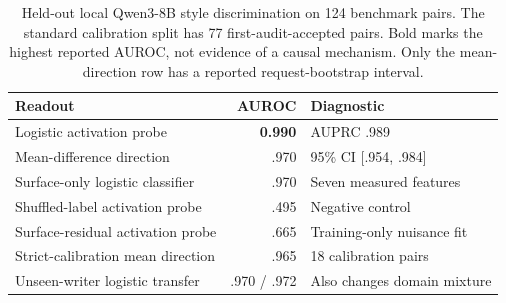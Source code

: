 \begin{table}[t]
\centering\small
\caption{Held-out local Qwen3-8B style discrimination on 124 benchmark pairs. The standard calibration split has 77 first-audit-accepted pairs. Bold marks the highest reported AUROC, not evidence of a causal mechanism. Only the mean-direction row has a reported request-bootstrap interval.}
\label{tab:probes}
\begin{tabular}{@{}lrl@{}}
\toprule
Readout & AUROC & Diagnostic \\
\midrule
Logistic activation probe & \textbf{0.990} & AUPRC .989 \\
Mean-difference direction & .970 & 95\% CI [.954, .984] \\
Surface-only logistic classifier & .970 & Seven measured features \\
Shuffled-label activation probe & .495 & Negative control \\
Surface-residual activation probe & .665 & Training-only nuisance fit \\
Strict-calibration mean direction & .965 & 18 calibration pairs \\
Unseen-writer logistic transfer & .970 / .972 & Also changes domain mixture \\
\bottomrule
\end{tabular}
\end{table}

